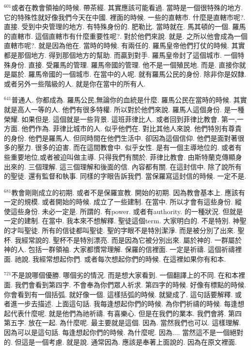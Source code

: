 \documentclass{book}
\begin{document}
$^{601}$或者在教會領袖的時候.
帶茶經.
其實應該可能看過.
當時是一個很特殊的地方.
它的特殊性就好像我們今天在中國.
裡面的時候.
一些的直轄市.
什麼是直轄市呢?.
直接.
受到中央管理的地方.
有特殊身份的.
肥勒比.
當時就在.
馬其頓的一個.
羅馬的直轄市.
這個直轄市有什麼重要性呢?.
對於他們來說.
就是.
之所以他會成為一個直轄市呢?.
就是因為他在.
當時的時候.
有兩任的.
羅馬皇帝他們打仗的時候.
其實都是那個地方.
得到那個地方的幫助.
而贏到對手.
羅馬皇帝封了這個城市.
一個特殊身份.
直接.
受羅馬的管理.
羅馬帝國的管理.
他不是一個殖民地.
而是.
直接你就是屬於.
羅馬帝國的一個城市.
在當中的人呢.
就有羅馬公民的身份.
除非你是奴隸.
或者另外一些階級的人.
就是你在當中的所有人.

$^{641}$普通人.
你都成為.
羅馬公民,無論你的血統是什麼.
羅馬公民在當時的時候.
其實就是高人一等的人.
他們有很多特權.
所以對於他們來說.
羅馬人這個身份.
是一種榮耀.
如果但是.
這個就是一些背景.
這班菲律比人.
或者回到菲律比教會.
第一,一方面.
他們作為.
菲律比城市的人.
似乎他們在.
對比其他人來說.
他們特別有尊貴的身份.
他們是羅馬人.
但同時間在他們生活中.
卻因為這個信仰.
他們是面對著很多的壓力.
很多的迫害.
而在這間教會中.
似乎女性.
是有一個主導地位的.
或者有些重要地位,或者被迫叫做主導.
只得我們有關於.
菲律比教會.
由斯特蘭克傳顯身出來的.
三個理解.
這三個理解和後面的信.
內容都有關.
在這封信中.
除了說所有的聖徒.
還有監督和執事.
同樣的字眼告訴我們.
當保羅寫這封信的時候.
一定不是.

$^{681}$教會剛剛成立的初期.
或者不是保羅宣教.
開始的初期.
因為教會基本上.
應該有一定的規模.
或者開始的時候.
成立了一些建制.
在當中.
所以才會有這些身份.
縱使這些身份.
未必一定是.
所謂的.
有power.
或者有authority.
的一種狀況.
但就是一定的建制.
在當中.
我本來不想解釋.
聖徒這個term.
大家明白的.
不是特別.
神聖的才叫聖徒.
所有的信徒都叫聖徒.
聖的字眼不是特別潔淨.
而是被分別了出來.
聖杯.
我經常說的.
聖杯不是特別漂亮.
而是因為它被分別出來.
屬於神的.
一群屬於神的人.
包括一群領袖.
大家都慣常理解.
保羅的信裡面.
一定是祈禱.
這個祈禱裡面.
祂說.
我經常想起你們.
或者每次想起你們的時候.
在這裡如果你有和本.

$^{721}$不是說哪個優勝.
哪個劣的情況.
而是想大家看到.
一個翻譯上的不同.
在和本裡面.
我們會看到第四字.
不會奉為你們眾人祈求.
第四字的時候.
好像有標點的時候.
你會看到有一個括弧.
就好像一個.
這樣括弧的時候.
就變成了.
這句話要解釋.
或者進一步去描述.
上面這句話.
我每逢想起你們的時候.
為你們祈禱的時候.
每逢想起代表什麼呢.
就是他們為祂祈禱.
有喜樂心.
但是在我們的業本.
我們會將.
第四第五字.
放在一起.
為什麼呢.
最主要就是這個.
因為.
當然我們也可以.
這樣理解.
因為可以是這句話.
每逢想起你們的時候.
為什麼呢.
因為....
當然這不是一個絕對的.
但這是一個考慮.
就是說.
通常因為.
應該是奉著上面說的.
因為在原文裡面.
\end{document}
